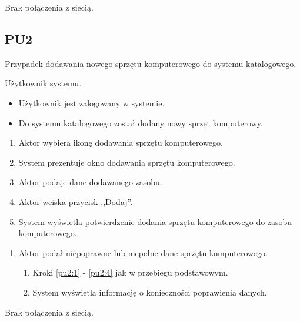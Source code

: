 Brak połączenia z siecią.



\subsection{PU2}

Przypadek dodawania nowego sprzętu komputerowego do systemu katalogowego.

Użytkownik systemu.

\begin{itemize}
\item Użytkownik jest zalogowany w systemie.
\end{itemize}

\begin{itemize}
\item Do systemu katalogowego został dodany nowy sprzęt komputerowy.
\end{itemize}

\begin{enumerate}
\item \label{pu2:1} Aktor wybiera ikonę dodawania sprzętu komputerowego.
\item System prezentuje okno dodawania sprzętu komputerowego.
\item Aktor podaje dane dodawanego zasobu.
\item \label{pu2:4} Aktor wciska przycisk ,,Dodaj''.
\item System wyświetla potwierdzenie dodania sprzętu komputerowego do zasobu komputerowego.
\end{enumerate}

\begin{enumerate}
\item Aktor podał niepoprawne lub niepełne dane sprzętu komputerowego.
	\begin{enumerate}[label*=\arabic*.]
		\item Kroki \ref{pu2:1} - \ref{pu2:4} jak w przebiegu podstawowym.
		\item System wyświetla informację o konieczności poprawienia danych.
	\end{enumerate}
\end{enumerate}

Brak połączenia z siecią.



